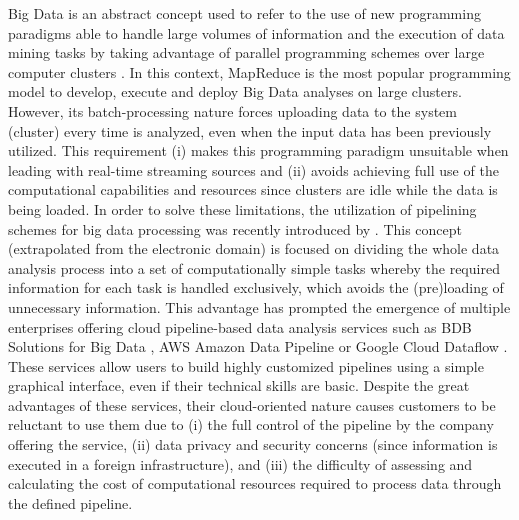 Big Data is an abstract concept used to refer to the use of new programming paradigms able to handle large volumes of information and the execution of data mining tasks by taking advantage of parallel programming schemes over large computer clusters \citep{D10, D11}. In this context, MapReduce \citep{D12, D13} is the most popular programming model to develop, execute and deploy Big Data analyses on large clusters. However, its batch-processing nature forces uploading data to the system (cluster) every time is analyzed, even when the input data has been previously utilized. This requirement (i) makes this programming paradigm unsuitable when leading with real-time streaming sources and (ii) avoids achieving full use of the computational capabilities and resources since clusters are idle while the data is being loaded. In order to solve these limitations, the utilization of pipelining schemes for big data processing was recently introduced by \cite{D14}. This concept (extrapolated from the electronic domain) is focused on dividing the whole data analysis process into a set of computationally simple tasks \citep{D15} whereby the required information for each task is handled exclusively, which avoids the (pre)loading of unnecessary information. This advantage has prompted the emergence of multiple enterprises offering cloud pipeline-based data analysis services such as BDB Solutions for Big Data \citep{D16}, AWS Amazon Data Pipeline \citep{D17} or Google Cloud Dataflow \citep{D18}. These services allow users to build highly customized pipelines using a simple graphical interface, even if their technical skills are basic. Despite the great advantages of these services, their cloud-oriented nature causes customers to be reluctant to use them due to (i) the full control of the pipeline by the company offering the service, (ii) data privacy and security concerns (since information is executed in a foreign infrastructure), and (iii) the difficulty of assessing and calculating the cost of computational resources required to process data through the defined pipeline.

